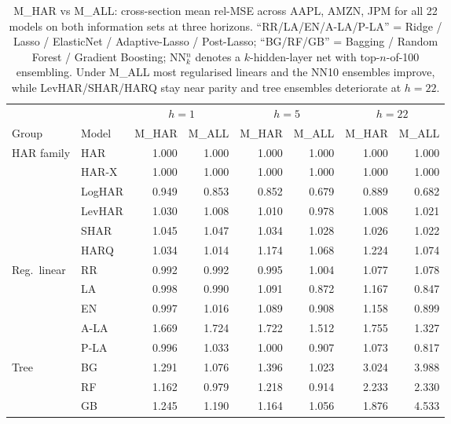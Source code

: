 \documentclass[twocolumn,9pt]{extarticle}
\begin{document}
\begin{table}[H]
\centering\scriptsize
\caption{M\_HAR vs M\_ALL: cross-section mean rel-MSE across AAPL,
AMZN, JPM for all 22 models on both information sets at three
horizons. ``RR/LA/EN/A-LA/P-LA'' = Ridge / Lasso / ElasticNet /
Adaptive-Lasso / Post-Lasso; ``BG/RF/GB'' = Bagging / Random Forest /
Gradient Boosting; NN$_k^{n}$ denotes a $k$-hidden-layer net with
top-$n$-of-100 ensembling.  Under M\_ALL most regularised linears
and the NN10 ensembles improve, while LevHAR/SHAR/HARQ stay near
parity and tree ensembles deteriorate at $h=22$.}
\label{tab:mhar-mall}
\begin{tabular}{ll|rr|rr|rr}
\toprule
 & & \multicolumn{2}{c|}{$h=1$} & \multicolumn{2}{c|}{$h=5$} & \multicolumn{2}{c}{$h=22$} \\
Group & Model & M\_HAR & M\_ALL & M\_HAR & M\_ALL & M\_HAR & M\_ALL \\
\midrule
HAR family   & HAR          & 1.000 & 1.000 & 1.000 & 1.000 & 1.000 & 1.000 \\
             & HAR-X        & 1.000 & 1.000 & 1.000 & 1.000 & 1.000 & 1.000 \\
             & LogHAR       & 0.949 & 0.853 & 0.852 & 0.679 & 0.889 & 0.682 \\
             & LevHAR       & 1.030 & 1.008 & 1.010 & 0.978 & 1.008 & 1.021 \\
             & SHAR         & 1.045 & 1.047 & 1.034 & 1.028 & 1.026 & 1.022 \\
             & HARQ         & 1.034 & 1.014 & 1.174 & 1.068 & 1.224 & 1.074 \\
\midrule
Reg.\ linear & RR           & 0.992 & 0.992 & 0.995 & 1.004 & 1.077 & 1.078 \\
             & LA           & 0.998 & 0.990 & 1.091 & 0.872 & 1.167 & 0.847 \\
             & EN           & 0.997 & 1.016 & 1.089 & 0.908 & 1.158 & 0.899 \\
             & A-LA         & 1.669 & 1.724 & 1.722 & 1.512 & 1.755 & 1.327 \\
             & P-LA         & 0.996 & 1.033 & 1.000 & 0.907 & 1.073 & 0.817 \\
\midrule
Tree         & BG           & 1.291 & 1.076 & 1.396 & 1.023 & 3.024 & 3.988 \\
             & RF           & 1.162 & 0.979 & 1.218 & 0.914 & 2.233 & 2.330 \\
             & GB           & 1.245 & 1.190 & 1.164 & 1.056 & 1.876 & 4.533 \\

\end{tabular}
\end{table}
\end{document}
